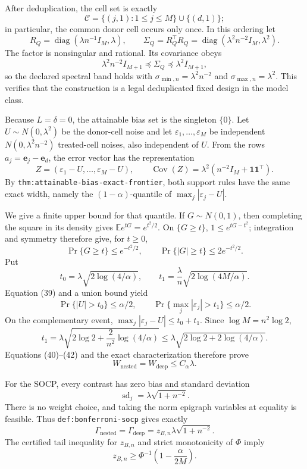 After deduplication, the cell set is exactly
\[
 \mathcal C=\{(j,1):1\leq j\leq M\}\cup\{(d,1)\}; \tag{35}
\]
in particular, the common donor cell occurs only once.  In this ordering let
\[
 R_Q=\operatorname{diag}(\lambda n^{-1}I_M,\lambda),
 \qquad
 \Sigma_Q=R_Q^{\top}R_Q
 =\operatorname{diag}(\lambda^2n^{-2}I_M,\lambda^2). \tag{36}
\]
The factor is nonsingular and rational.  Its covariance obeys
\[
 \lambda^2n^{-2}I_{M+1}\preceq\Sigma_Q
 \preceq\lambda^2I_{M+1}, \tag{37}
\]
so the declared spectral band holds with
\(\sigma_{\min,n}=\lambda^2n^{-2}\) and
\(\sigma_{\max,n}=\lambda^2\).  This verifies that
the construction is a legal deduplicated fixed design in the model class.

Because \(L=\delta=0\), the attainable bias set is the singleton
\(\{0\}\).  Let \(U\sim N(0,\lambda^2)\) be the donor-cell noise and let
\(\varepsilon_1,\ldots,\varepsilon_M\) be independent
\(N(0,\lambda^2n^{-2})\) treated-cell noises, also independent of \(U\).
From the
rows \(a_j=\mathbf e_j-\mathbf e_d\), the error vector has the representation
\[
 Z=(\varepsilon_1-U,\ldots,\varepsilon_M-U),
 \qquad
 \operatorname{Cov}(Z)=\lambda^2
 (n^{-2}I_M+\mathbf1\mathbf1^{\top}). \tag{38}
\]
By \texttt{thm:attainable-bias-exact-frontier}, both support rules have the
same exact width, namely the \((1-\alpha)\)-quantile of
\(\max_j|\varepsilon_j-U|\).

We give a finite upper bound for that quantile.  If \(G\sim N(0,1)\), then
completing the square in its density gives
\(\mathbb E e^{tG}=e^{t^2/2}\).  On \(\{G\geq t\}\),
\(1\leq e^{tG-t^2}\); integration and symmetry therefore give, for
\(t\geq0\),
\[
 \Pr\{G\geq t\}\leq e^{-t^2/2},
 \qquad
 \Pr\{|G|\geq t\}\leq2e^{-t^2/2}. \tag{39}
\]
Put
\[
 t_0=\lambda\sqrt{2\log(4/\alpha)},
 \qquad
 t_1=\frac{\lambda}{n}\sqrt{2\log(4M/\alpha)}. \tag{40}
\]
Equation (39) and a union bound yield
\[
 \Pr\{|U|>t_0\}\leq\alpha/2,
 \qquad
 \Pr\{\max_j|\varepsilon_j|>t_1\}\leq\alpha/2. \tag{41}
\]
On the complementary event,
\(\max_j|\varepsilon_j-U|\leq t_0+t_1\).  Since
\(\log M=n^2\log2\),
\[
 t_1=\lambda\sqrt{2\log2+\frac{2}{n^2}\log(4/\alpha)}
 \leq\lambda\sqrt{2\log2+2\log(4/\alpha)}. \tag{42}
\]
Equations (40)--(42) and the exact characterization therefore prove
\[
 W_{\mathrm{nested}}=W_{\mathrm{deep}}\leq C_\alpha\lambda. \tag{43}
\]

For the SOCP, every contrast has zero bias and standard deviation
\[
 \operatorname{sd}_j=\lambda\sqrt{1+n^{-2}}. \tag{44}
\]
There is no weight choice, and taking the norm epigraph variables at equality
is feasible.  Thus \texttt{def:bonferroni-socp} gives exactly
\[
 \Gamma_{\mathrm{nested}}=\Gamma_{\mathrm{deep}}
 =z_{B,n}\lambda\sqrt{1+n^{-2}}. \tag{45}
\]
The certified tail inequality for \(z_{B,n}\) and strict monotonicity of
\(\Phi\) imply
\[
 z_{B,n}\geq\Phi^{-1}\!\left(1-\frac{\alpha}{2M}\right). \tag{46}
\]

